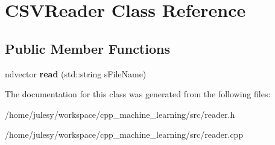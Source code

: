 \hypertarget{classCSVReader}{\section{C\-S\-V\-Reader Class Reference}
\label{classCSVReader}
}
\subsection*{Public Member Functions}
\begin{DoxyCompactItemize}
\item 
\hypertarget{classCSVReader_a0cbadb85cb199a9d910cdc519c0969ca}{ndvector {\bfseries read} (std\-::string s\-File\-Name)}\label{classCSVReader_a0cbadb85cb199a9d910cdc519c0969ca}

\end{DoxyCompactItemize}


The documentation for this class was generated from the following files\-:\begin{DoxyCompactItemize}
\item 
/home/julesy/workspace/cpp\-\_\-machine\-\_\-learning/src/reader.\-h\item 
/home/julesy/workspace/cpp\-\_\-machine\-\_\-learning/src/reader.\-cpp\end{DoxyCompactItemize}
